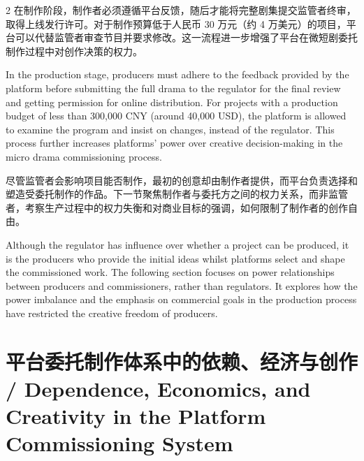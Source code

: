 \documentclass[10pt,a4paper]{article}
\begin{document}
\begin{paracol}{2}
\switchcolumn*
在制作阶段，制作者必须遵循平台反馈，随后才能将完整剧集提交监管者终审，取得上线发行许可。对于制作预算低于人民币 30 万元（约 4 万美元）的项目，平台可以代替监管者审查节目并要求修改。这一流程进一步增强了平台在微短剧委托制作过程中对创作决策的权力。\par
\switchcolumn
In the production stage, producers must adhere to the feedback provided by the platform before submitting the full drama to the regulator for the final review and getting permission for online distribution. For projects with a production budget of less than 300,000 CNY (around 40,000 USD), the platform is allowed to examine the program and insist on changes, instead of the regulator. This process further increases platforms’ power over creative decision-making in the micro drama commissioning process.\par
\switchcolumn*
尽管监管者会影响项目能否制作，最初的创意却由制作者提供，而平台负责选择和塑造受委托制作的作品。下一节聚焦制作者与委托方之间的权力关系，而非监管者，考察生产过程中的权力失衡和对商业目标的强调，如何限制了制作者的创作自由。\par
\switchcolumn
Although the regulator has influence over whether a project can be produced, it is the producers who provide the initial ideas whilst platforms select and shape the commissioned work. The following section focuses on power relationships between producers and commissioners, rather than regulators. It explores how the power imbalance and the emphasis on commercial goals in the production process have restricted the creative freedom of producers.\par
\switchcolumn*
\end{paracol}
\section*{平台委托制作体系中的依赖、经济与创作 / Dependence, Economics, and Creativity in the Platform Commissioning System}
\end{document}
